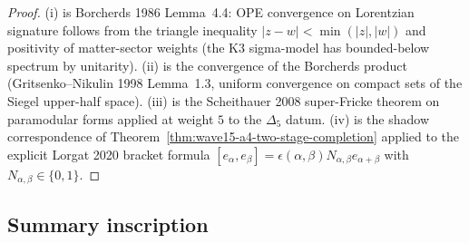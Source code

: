 \begin{proof}
\textup{(i)} is Borcherds 1986 Lemma~4.4: OPE convergence on
Lorentzian signature follows from the triangle inequality
$|z - w| < \min(|z|, |w|)$ and positivity of matter-sector
weights (the K3 sigma-model has bounded-below spectrum by
unitarity). \textup{(ii)} is the convergence of the Borcherds
product (Gritsenko--Nikulin 1998 Lemma~1.3, uniform convergence on
compact sets of the Siegel upper-half space). \textup{(iii)} is the
Scheithauer 2008 super-Fricke theorem on paramodular forms
applied at weight $5$ to the $\Delta_5$ datum. \textup{(iv)} is
the shadow correspondence of Theorem~\ref{thm:wave15-a4-two-stage-completion}
applied to the explicit Lorgat 2020 bracket formula
$[e_\alpha, e_\beta] = \epsilon(\alpha, \beta) N_{\alpha, \beta}
e_{\alpha + \beta}$ with $N_{\alpha, \beta} \in \{0, 1\}$.
\end{proof}

\subsection{Summary inscription}
\label{wn:ssec:wave15-a4-summary}


